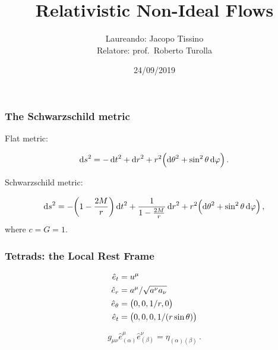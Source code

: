 \documentclass{beamer}
\title{Relativistic Non-Ideal Flows}
\author{Laureando: Jacopo Tissino \\
    Relatore: prof.\ Roberto Turolla}
\date{24/09/2019}
\begin{document}
\frame{\titlepage}

\begin{frame}
    \frametitle{The Schwarzschild metric}
    Flat metric:

    \begin{equation*}
        \dd{s}^2 = -\dd{t}^2 + \dd{r}^2 + r^2 \qty(\dd{\theta}^2 + \sin^2\theta \dd{\varphi})\,.
    \end{equation*}

    Schwarzschild metric:

    \begin{equation*}
        \dd{s}^2 = -\qty(1-\frac{2M}{r})\dd{t}^2 + \frac{1}{1-\frac{2M}{r}} \dd{r}^2
        + r^2 \qty(\dd{\theta}^2 + \sin^2\theta \dd{\varphi})\,,
    \end{equation*}
    where \(c = G = 1\).


\end{frame}

%
%

\begin{frame}
    \frametitle{Tetrads: the Local Rest Frame}

    \begin{align*}
      \hat{e}_t &= u^\mu  \\
      \hat{e}_r &= a^\mu / \sqrt{a^\nu a_\nu}   \\
      \hat{e}_\theta &= \qty(0,0,1/r,0)  \\
      \hat{e}_t &= \qty(0,0,0,1/(r \sin\theta))
    \end{align*}

    \begin{equation*}
        g_{\mu\nu} \hat{e}^\mu _{(\alpha)} \hat{e}^\nu _{(\beta)} = \eta_{(\alpha) (\beta)}\,.
    \end{equation*}


\end{frame}
\end{document}
